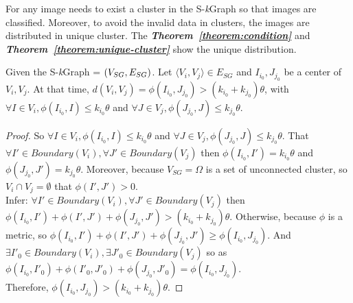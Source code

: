 \documentclass{amcs}
\begin{document}
For any image needs to exist a cluster in the S-\textit{k}Graph so that images are classified. Moreover, to avoid the invalid data in clusters, the images are distributed in unique cluster. The \textit{\textbf{Theorem~\ref{theorem:condition}}} and \textit{\textbf{Theorem~\ref{theorem:unique-cluster}}} show the unique distribution.

\begin{theorem}{}
Given the S-\textit{k}Graph = $\left( {{V_{SG}},{\rm{ }}{E_{SG}}} \right)$. Let $\langle {V_i},{V_j}\rangle  \in {E_{SG}}$ and ${I_{{i_0}}},{J_{{j_0}}}$ be a center of ${V_i},{V_j}$. At that time, $d({V_i},{V_j}) = \phi ({I_{{i_0}}},{J_{{j_0}}}) > ({k_{{i_0}}} + {k_{{j_0}}})\theta $, with $\forall I \in {V_i},\phi ({I_{{i_0}}},I) \le {k_{{i_0}}}\theta $ and $\forall J \in {V_j},\phi ({J_{{j_0}}},J) \le {k_{{j_0}}}\theta $.
\label{theorem:condition}
\end{theorem}
\begin{proof}{}
So $\forall I \in {V_i},\phi ({I_{{i_0}}},I) \le {k_{{i_0}}}\theta $ and $\forall J \in {V_j},\phi ({J_{{j_0}}},J) \le {k_{{j_0}}}\theta $. That $\forall I' \in Boundary({V_i}),\forall J' \in Boundary({V_j})$ then $\phi ({I_{{i_0}}},I') = {k_{{i_0}}}\theta $ and $\phi ({J_{{j_0}}},J') = {k_{{j_0}}}\theta $. Moreover, because ${V_{SG}} = \Omega $ is a set of unconnected cluster, so  ${V_i} \cap {V_j} = \emptyset $ that $\phi (I',J') > 0$.
\\Infer: $\forall I' \in Boundary({V_i}),\forall J' \in Boundary({V_j})$ then $\phi ({I_{{i_0}}},I') + \phi (I',J') + \phi ({J_{{j_0}}},J') > ({k_{{i_0}}} + {k_{{j_0}}})\theta $. Otherwise, because $\phi $ is a metric, so $\phi ({I_{{i_0}}},I') + \phi (I',J') + \phi ({J_{{j_0}}},J') \ge \phi ({I_{{i_0}}},{J_{{j_0}}})$. And $\exists {I'_0} \in Boundary({V_i}),\exists {J'_0} \in Boundary({V_j})$ so as $\phi ({I_{{i_0}}},{I'_0}) + \phi ({I'_0},{J'_0}) + \phi ({J_{{j_0}}},{J'_0}) = \phi ({I_{{i_0}}},{J_{{j_0}}})$.
\\ Therefore, $\phi ({I_{{i_0}}},{J_{{j_0}}}) > ({k_{{i_0}}} + {k_{{j_0}}})\theta $.
\end{proof}
\end{document}
